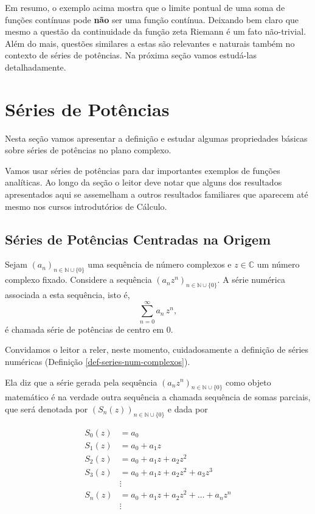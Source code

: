 Em resumo, o exemplo acima mostra que o limite pontual de uma soma 
de funções contínuas pode \textbf{não} ser uma função contínua. Deixando bem claro
que mesmo a questão da continuidade da função zeta Riemann é um fato
não-trivial. Além do mais, questões similares a estas são relevantes e naturais
também no contexto de séries de potências. Na próxima seção 
vamos estudá-las detalhadamente.


\section{Séries de Potências}
\label{sec-series-potencias}

Nesta seção vamos apresentar a definição e estudar algumas propriedades
básicas sobre séries de potências no plano complexo. 

Vamos usar séries de potências para dar importantes exemplos
de funções analíticas. Ao longo da seção o leitor deve notar
que alguns dos resultados apresentados aqui 
se assemelham a outros resultados familiares que aparecem até 
mesmo nos cursos introdutórios de Cálculo. 




\subsection{Séries de Potências Centradas na Origem}
\label{subsec-series-pot-centro-zero}
\begin{definicao}
\label{def-series-de-potencias}
Sejam $(a_n)_{n\in\mathbb{N}\cup\{0\}}$ uma sequência 
de número complexos e $z\in\mathbb{C}$ um número complexo fixado. 
Considere a sequência $(a_nz^n)_{n\in\mathbb{N}\cup\{0\}}$.
A série numérica associada a esta sequência, isto é,
\[
\sum_{n=0}^{\infty} a_n\, z^n,
\]
é chamada série de potências de centro em $0$.
\end{definicao}


Convidamos o leitor a reler, neste momento, 
cuidadosamente a definição de séries 
numéricas (Definição \ref{def-series-num-complexos}).

Ela diz que a série gerada pela sequência
$(a_nz^n)_{n\in\mathbb{N}\cup\{0\}}$ 
como objeto matemático é na verdade outra sequência 
a chamada sequência de somas parciais, que será denotada por $(S_n(z))_{n\in\mathbb{N}\cup\{0\}}$ e dada por

\begin{align*}
S_0(z) 	&= a_0
\\
S_1(z) 	&= a_0+a_1z
\\
S_2(z) 	&= a_0+a_1z+a_2z^2
\\
S_3(z)	&= a_0+a_1z+a_2z^2+a_3z^3
\\
		&\vdots	
\\
S_n(z)	&= a_0+a_1z+a_2z^2+\ldots+a_nz^n
\\
		&\vdots	
\end{align*}

